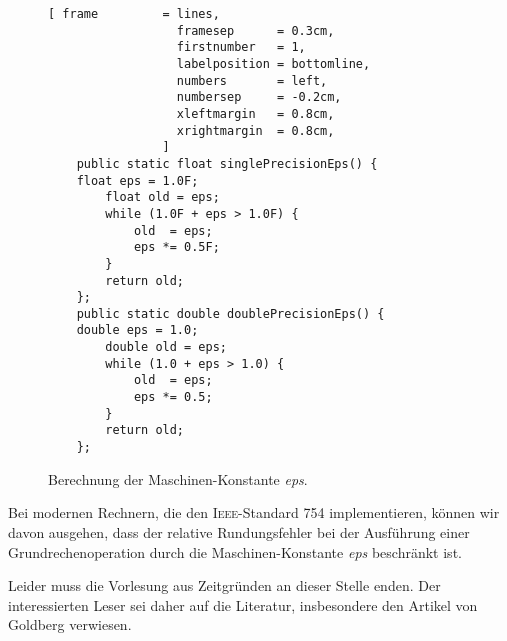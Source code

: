 \begin{figure}[!ht]
\centering
\begin{Verbatim}[ frame         = lines, 
                  framesep      = 0.3cm, 
                  firstnumber   = 1,
                  labelposition = bottomline,
                  numbers       = left,
                  numbersep     = -0.2cm,
                  xleftmargin   = 0.8cm,
                  xrightmargin  = 0.8cm,
                ]
    public static float singlePrecisionEps() {
	float eps = 1.0F;
        float old = eps;
        while (1.0F + eps > 1.0F) {
            old  = eps;
            eps *= 0.5F;
        }
        return old;
    };
    public static double doublePrecisionEps() {
	double eps = 1.0;
        double old = eps;
        while (1.0 + eps > 1.0) {
            old  = eps;
            eps *= 0.5;
        }
        return old;
    };
\end{Verbatim}
\vspace*{-0.3cm}
\caption{Berechnung der Maschinen-Konstante \textsl{eps}.}
\label{fig:maschinen-konstante.stlx}
\end{figure}

\noindent
Bei modernen Rechnern, die den \textsc{Ieee}-Standard 754 implementieren, k\"onnen wir davon ausgehen, dass
der relative Rundungsfehler bei der Ausf\"uhrung 
einer  Grundrechenoperation durch die Maschinen-Konstante \textsl{eps} beschr\"ankt ist.

Leider muss die Vorlesung aus Zeitgr\"unden an dieser Stelle enden.  Der interessierten Leser sei daher
auf die Literatur, insbesondere den Artikel von Goldberg \cite{goldberg:91} verwiesen. 

